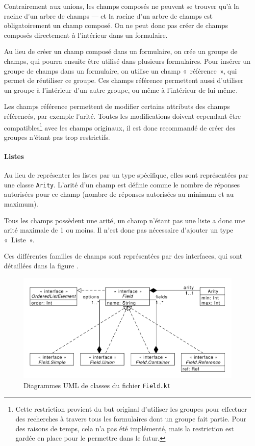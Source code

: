 Contrairement aux unions, les champs composés ne peuvent se trouver qu'à la racine d'un arbre de champs --- et la racine d'un arbre de champs est obligatoirement un champ composé.
On ne peut donc pas créer de champs composés directement à l'intérieur dans un formulaire.

Au lieu de créer un champ composé dans un formulaire, on crée un groupe de champs, qui pourra ensuite être utilisé dans plusieurs formulaires.
Pour insérer un groupe de champs dans un formulaire, on utilise un champ «~référence~», qui permet de réutiliser ce groupe.
Ces champs référence permettent aussi d'utiliser un groupe à l'intérieur d'un autre groupe, ou même à l'intérieur de lui-même.

Les champs référence permettent de modifier certains attributs des champs référencés, par exemple l'arité.
Toutes les modifications doivent cependant être compatibles\footnote{Cette restriction provient du but original d'utiliser les groupes pour effectuer des recherches à travers tous les formulaires dont un groupe fait partie. Pour des raisons de temps, cela n'a pas été implémenté, mais la restriction est gardée en place pour le permettre dans le futur.} avec les champs originaux, il est donc recommandé de créer des groupes n'étant pas trop restrictifs.

\paragraph{Listes}
Au lieu de représenter les listes par un type spécifique, elles sont représentées par une classe \lstinline{Arity}.
L'arité d'un champ est définie comme le nombre de réponses autorisées pour ce champ (nombre de réponses autorisées au minimum et au maximum).

Tous les champs possèdent une arité, un champ n'étant pas une liste a donc une arité maximale de 1 ou moins.
Il n'est donc pas nécessaire d'ajouter un type «~Liste~».

\uparagraph
Ces différentes familles de champs sont représentées par des interfaces, qui sont détaillées dans la figure .

\begin{figure}[tp]
	\caption{Diagrammes UML de classes du fichier \lstinline{Field.kt}}
	\label{fig:uml-fields}
	\includegraphics[width=\textwidth]{reports-forms-fields}
\end{figure}

